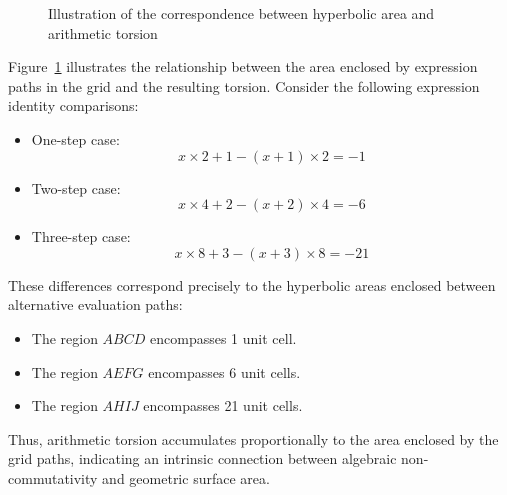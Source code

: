 \begin{figure}[ht]
\centering
{}
\caption{Illustration of the correspondence between hyperbolic area and arithmetic torsion}\label{fig:area-formula}
\end{figure}

Figure~\ref{fig:area-formula} illustrates the relationship between the area enclosed by expression paths in the grid and the resulting torsion. Consider the following expression identity comparisons:

\begin{itemize}
\item One-step case:
\begin{equation}
x \times 2 + 1 - (x + 1) \times 2 = -1
\end{equation}

\item Two-step case:
\begin{equation}
    x \times 4 + 2 - (x + 2) \times 4 = -6
\end{equation}

\item Three-step case:
\begin{equation}
    x \times 8 + 3 - (x + 3) \times 8 = -21
\end{equation}\end{itemize}

These differences correspond precisely to the hyperbolic areas enclosed between alternative evaluation paths:

\begin{itemize}
\item The region $ABCD$ encompasses 1 unit cell.
\item The region $AEFG$ encompasses 6 unit cells.
\item The region $AHIJ$ encompasses 21 unit cells.
\end{itemize}
Thus, arithmetic torsion accumulates proportionally to the area enclosed by the grid paths, indicating an intrinsic connection between algebraic non-commutativity and geometric surface area.

